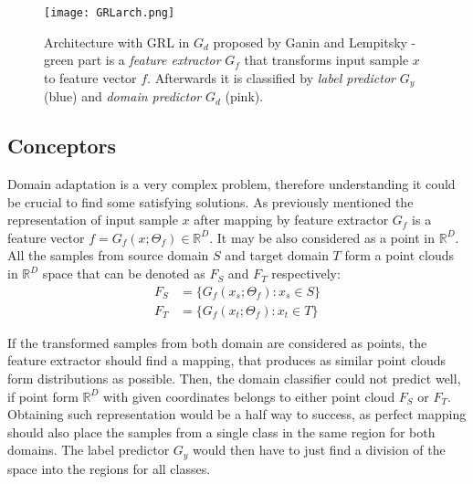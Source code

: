 \documentclass{article}
\begin{document}
\begin{figure}%
    \centering
    \texttt{[image: GRLarch.png]}%
    \caption{Architecture with GRL in $G_{d}$ proposed by Ganin and Lempitsky - green part is a \textit{feature extractor} $G_{f}$ that transforms input sample $x$ to feature vector $f$. Afterwards it is classified by \textit{label predictor} $G_{y}$ (blue) and \textit{domain predictor} $G_{d}$ (pink).}
    \label{fig:GRLarch}%
\end{figure}

\subsection{Conceptors}
Domain adaptation is a very complex problem, therefore understanding it could be crucial to find some satisfying solutions. As previously mentioned the representation of input sample $x$ after mapping by feature extractor $G_{f}$ is a feature vector $f = G_{f}(x ; \Theta_{f}) \in \mathbb{R}^{D}$. It may be also considered as a point in $\mathbb{R}^{D}$. All the samples from source domain $S$ and target domain $T$ form a point clouds in $\mathbb{R}^{D}$ space that can be denoted as $F_{S}$ and $F_{T}$ respectively:
\begin{align*}
    F_{S} &= \{ G_{f}(x_{s} ; \Theta_{f}) : x_{s} \in S  \} \\
    F_{T} &= \{ G_{f}(x_{t} ; \Theta_{f}) : x_{t} \in T  \}
\end{align*}
\par
If the transformed samples from both domain are considered as points, the feature extractor should find a mapping, that produces as similar point clouds form distributions as possible. Then, the domain classifier could not predict well, if point form $\mathbb{R}^{D}$ with given coordinates belongs to either point cloud $F_{S}$ or $F_{T}$. Obtaining such representation would be a half way to success, as perfect mapping should also place the samples from a single class in the same region for both domains. The label predictor $G_{y}$ would then have to just find a division of the space into the regions for all classes.
\par
\end{document}
